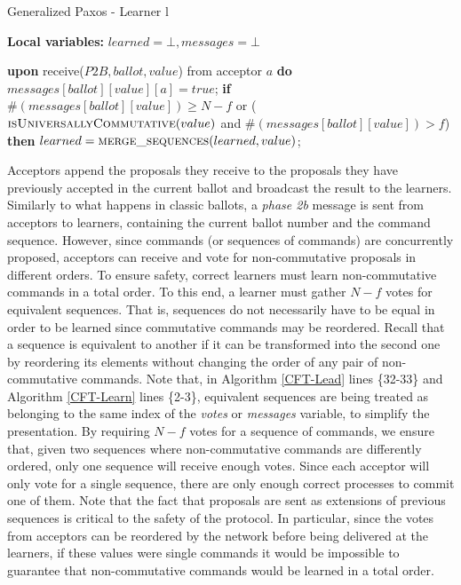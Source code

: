 \begin{algorithm}
	\caption{Generalized Paxos - Learner l}
	\label{CFT-Learn}
	\textbf{Local variables: } $learned = \bot, messages = \bot$ 
	\begin{algorithmic}[1]
		\State \textbf{upon} receive($P2B, ballot, value$) from acceptor $a$ \textbf{do}
		\State \hspace{\algorithmicindent} $messages[ballot][value][a] = true$;
		\State \hspace{\algorithmicindent} \textbf{if} $\#(messages[ballot][value]) \geq N-f$ or ($\Call{isUniversallyCommutative}{value}$ and $\#(messages[ballot][value]) > f$) \textbf{then}
		\State \hspace{\algorithmicindent} \hspace{\algorithmicindent} $learned = \Call{merge\_sequences}{learned, value}$;
	\end{algorithmic}
\end{algorithm}

Acceptors append the proposals they receive to the proposals they have previously accepted in the current ballot and broadcast the result to the learners. Similarly to what happens in classic ballots, a \textit{phase 2b} message is sent from acceptors to learners, containing the current ballot number and the command sequence. However, since commands (or sequences of commands) are concurrently proposed, acceptors can receive and vote for non-commutative proposals in different orders. To ensure safety, correct learners must learn non-commutative commands in a total order. To this end, a learner must gather $N-f$ votes for equivalent sequences. That is, sequences do not necessarily have to be equal in order to be learned since commutative commands may be reordered. Recall that a sequence is equivalent to another if it can be transformed into the second one by reordering its elements without changing the order of any pair of non-commutative commands. Note that, in Algorithm \ref{CFT-Lead} lines \{32-33\} and Algorithm \ref{CFT-Learn} lines \{2-3\}, equivalent sequences are being treated as belonging to the same index of the \textit{votes} or \emph{messages} variable, to simplify the presentation. By requiring $N-f$ votes for a sequence of commands, we ensure that, given two sequences where non-commutative commands are differently ordered, only one sequence will receive enough votes. Since each acceptor will only vote for a single sequence, there are only enough correct processes to commit one of them. Note that the fact that proposals are sent as extensions of previous sequences is critical to the safety of the protocol. In particular, since the votes from acceptors can be reordered by the network before being delivered at the learners, if these values were single commands it would be impossible to guarantee that non-commutative commands would be learned in a total order. \par

